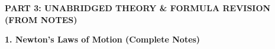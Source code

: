 \documentclass[11pt,a4paper]{article}
\begin{document}
\vspace{5pt}


\begin{tcolorbox}[sectionbanner]
  {\large \textbf{\textsf{PART 3: UNABRIDGED THEORY \& FORMULA REVISION (FROM NOTES)}}}
\end{tcolorbox}
\vspace{4pt}

\begin{tcolorbox}[chapterbanner]
  {\Large \textbf{\textsf{1. Newton's Laws of Motion (Complete Notes)}}}
\end{tcolorbox}
\vspace{4pt}
\end{document}
